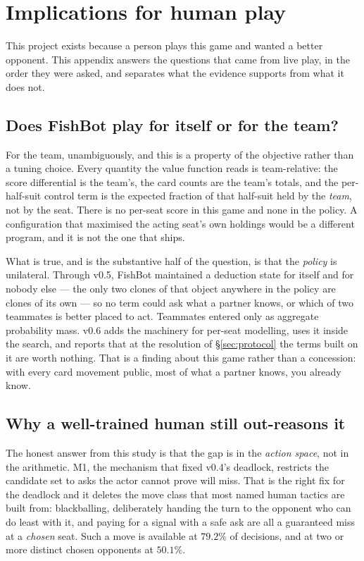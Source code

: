 \section{Implications for human play}
\label{app:human}

This project exists because a person plays this game and wanted a better opponent. This appendix
answers the questions that came from live play, in the order they were asked, and separates what
the evidence supports from what it does not.

\subsection{Does FishBot play for itself or for the team?}
\label{app:human-labels}

For the team, unambiguously, and this is a property of the objective rather than a tuning choice.
Every quantity the value function reads is team-relative: the score differential is the team's, the
card counts are the team's totals, and the per-half-suit control term is the expected fraction of
that half-suit held by the \emph{team}, not by the seat. There is no per-seat score in this game and
none in the policy. A configuration that maximised the acting seat's own holdings would be a
different program, and it is not the one that ships.

What is true, and is the substantive half of the question, is that the \emph{policy} is unilateral.
Through v0.5, FishBot maintained a deduction state for itself and for nobody else --- the only two
clones of that object anywhere in the policy are clones of its own --- so no term could ask what a
partner knows, or which of two teammates is better placed to act. Teammates entered only as
aggregate probability mass. v0.6 adds the machinery for per-seat modelling, uses it inside the
search, and reports that at the resolution of \S\ref{sec:protocol} the terms built on it are worth
nothing. That is a finding about this game rather than a concession: with every card movement
public, most of what a partner knows, you already know.

\subsection{Why a well-trained human still out-reasons it}
\label{app:human-ask}

The honest answer from this study is that the gap is in the \emph{action space}, not in the
arithmetic. M1, the mechanism that fixed v0.4's deadlock, restricts the candidate set to asks the
actor cannot prove will miss. That is the right fix for the deadlock and it deletes the move class
that most named human tactics are built from: blackballing, deliberately handing the turn to the
opponent who can do least with it, and paying for a signal with a safe ask are all a guaranteed miss
at a \emph{chosen} seat. Such a move is available at $79.2\%$ of decisions, and at two or more
distinct chosen opponents at $50.1\%$.

